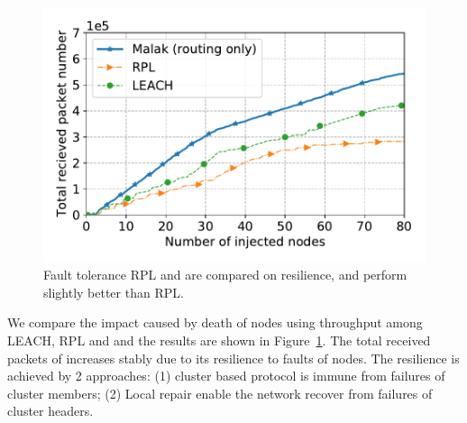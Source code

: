 \begin{figure}[!h]
	\centering
	\includegraphics[width=.95\columnwidth]{Figure/fault_tolerance}
	\vspace{-0.1in}
	\caption{Fault tolerance
		\textnormal{
			RPL and {\sdn} are compared on resilience, and {\sdn} perform
			slightly better than RPL.
		}}
	\label{fig:fault_tolerance}
\end{figure}

We compare the impact caused by death of nodes using throughput among LEACH, RPL
and {\sdn} and the results are shown in Figure~\ref{fig:fault_tolerance}. The
total received packets of {\sdn} increases stably due to its resilience to faults
of nodes. The resilience is achieved by 2 approaches: (1) cluster based protocol
is immune from failures of cluster members; (2) Local repair enable the network
recover from failures of cluster headers.


